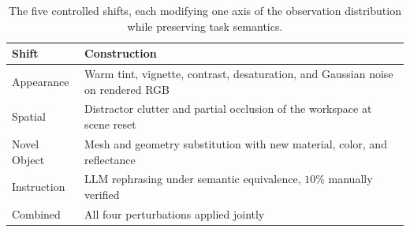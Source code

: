 \begin{table}[tbp]
    \centering
    \setlength{\abovecaptionskip}{0pt}
    \setlength{\belowcaptionskip}{2pt}
    \caption{The five controlled shifts, each modifying one axis of the observation distribution while preserving task semantics.}
    \label{tab:shift-construction}
    \scriptsize
    \renewcommand{\arraystretch}{0.92}
    \setlength{\tabcolsep}{3pt}
    \begin{tabular}{@{}l p{\dimexpr\columnwidth-1.75cm\relax}@{}}
        \toprule
        \textbf{Shift} & \textbf{Construction} \\
        \midrule
        Appearance   & Warm tint, vignette, contrast, desaturation, and Gaussian noise on rendered RGB \\
        Spatial      & Distractor clutter and partial occlusion of the workspace at scene reset \\
        Novel Object & Mesh and geometry substitution with new material, color, and reflectance \\
        Instruction  & LLM rephrasing under semantic equivalence, $10\%$ manually verified \\
        Combined     & All four perturbations applied jointly \\
        \bottomrule
    \end{tabular}
\end{table}
